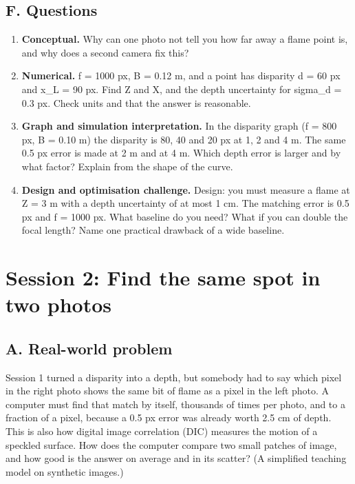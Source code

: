 \documentclass[11pt,a4paper]{article}
\begin{document}
\subsection*{F. Questions}
\begin{enumerate}[nosep]
\item \textbf{Conceptual.} Why can one photo not tell you how far away a flame point is, and why does a second camera fix this?
\item \textbf{Numerical.} f = 1000 px, B = 0.12 m, and a point has disparity d = 60 px and x\_L = 90 px. Find Z and X, and the depth uncertainty for sigma\_d = 0.3 px. Check units and that the answer is reasonable.
\item \textbf{Graph and simulation interpretation.} In the disparity graph (f = 800 px, B = 0.10 m) the disparity is 80, 40 and 20 px at 1, 2 and 4 m. The same 0.5 px error is made at 2 m and at 4 m. Which depth error is larger and by what factor? Explain from the shape of the curve.
\item \textbf{Design and optimisation challenge.} Design: you must measure a flame at Z = 3 m with a depth uncertainty of at most 1 cm. The matching error is 0.5 px and f = 1000 px. What baseline do you need? What if you can double the focal length? Name one practical drawback of a wide baseline.
\end{enumerate}

\section{Session 2: Find the same spot in two photos}

\subsection*{A. Real-world problem}
Session 1 turned a disparity into a depth, but somebody had to say which pixel in the right photo shows the same bit of flame as a pixel in the left photo. A computer must find that match by itself, thousands of times per photo, and to a fraction of a pixel, because a 0.5 px error was already worth 2.5 cm of depth. This is also how digital image correlation (DIC) measures the motion of a speckled surface. How does the computer compare two small patches of image, and how good is the answer on average and in its scatter? (A simplified teaching model on synthetic images.)
\end{document}
